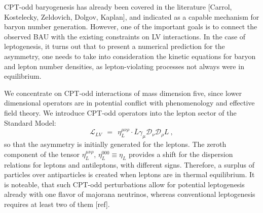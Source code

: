 \documentclass[12pt]{revtex4}
\newcommand{\md}{\mathcal{D}}
\newcommand{\ov}{\overline}
\begin{document}


	CPT-odd baryogenesis has already been covered in the literature 
	[Carrol, Kostelecky, Zeldovich, Dolgov, Kaplan], and indicated as a capable
	mechanism for baryon number generation.
	However, one of the important goals is to connect the observed BAU with the existing 
	constraints on LV interactions.
	In the case of leptogenesis, 
	it turns out that to present a numerical prediction for the asymmetry, 
	one needs to take into consideration the kinetic equations for baryon and lepton
	number densities, as lepton-violating processes not always were in equilibrium.

	We concentrate on CPT-odd interactions of mass dimension five, since
	lower dimensional operators are in potential conflict with phenomenology and
	effective field theory.
%	
	We introduce CPT-odd operators into the lepton sector of the Standard Model:
\begin{equation}
\label{LV}
	\mathcal{L}_{LV} ~~=~~ \eta_L^{\mu\nu\rho}\cdot \ov{L}\gamma_\mu \md_\nu \md_\rho L~,
\end{equation}
	so that the asymmetry is initially generated for the leptons.
	The zeroth component of the tensor $ \eta_L^{\mu\nu\rho} $, $ \eta_L^{000} \equiv \eta_L $ provides a 
	shift for the dispersion relations for leptons and antileptons, with different signs. 
	Therefore, a surplus of particles over antiparticles is created when leptons are
	in thermal equilibrium.
	It is noteable, that such CPT-odd perturbations allow for potential leptogenesis already
	with one flavor of majorana neutrinos, whereas conventional leptogenesis requires
	at least two of them [ref].
	
\end{document}
